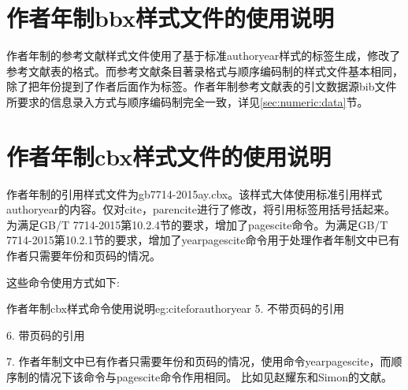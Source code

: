 \section{作者年制bbx样式文件的使用说明}

作者年制的参考文献样式文件使用了基于标准authoryear样式的标签生成，修改了参考文献表的格式。而参考文献条目著录格式与顺序编码制的样式文件基本相同，除了把年份提到了作者后面作为标签。作者年制参考文献表的引文数据源bib文件所要求的信息录入方式与顺序编码制完全一致，详见\ref{sec:numeric:data}节。





\section{作者年制cbx样式文件的使用说明}\label{sec:cbxay:usage}

作者年制的引用样式文件为gb7714-2015ay.cbx。该样式大体使用标准引用样式authoryear的内容。仅对cite，parencite进行了修改，将引用标签用括号括起来。为满足GB/T 7714-2015第10.2.4节的要求，增加了pagescite命令。为满足GB/T 7714-2015第10.2.1节的要求，增加了yearpagescite命令用于处理作者年制文中已有作者只需要年份和页码的情况。

这些命令使用方式如下:

\begin{codetex}{作者年制cbx样式命令使用说明}{eg:citeforauthoryear}
5. 不带页码的引用\cite{Peebles2001-100-100}\parencite{Miroslav2004--}

6. 带页码的引用\cite[见][49页]{蔡敏2006--}\parencite[见][49页]{Miroslav2004--}

7. 作者年制文中已有作者只需要年份和页码的情况，使用命令yearpagescite，而顺序制的情况下该命令与pagescite命令作用相同。
比如见赵耀东和Simon的文献。
\end{codetex}


